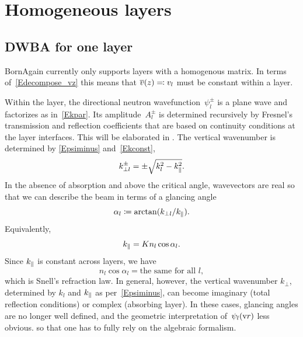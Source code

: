 \section{Homogeneous layers}\label{SLayHomo}

\subsection{DWBA for one layer}\label{SStep}

BornAgain currently only supports layers with a homogenous matrix.
In terms of~\cref{Edecompose_vz} this means that
$\overline{v}(z)\eqqcolon v_l$ must be constant within a layer.

Within the layer, the directional neutron wavefunction~$\psi^\pm_l$
is a plane wave and factorizes as in~\cref{Ekpar}.
Its amplitude~$A_l^\pm$ is determined recursively
by Fresnel's transmission and reflection coefficients
%
that are based on continuity conditions at the layer interfaces.
This will be elaborated in .
%
%
The vertical wavenumber is determined by \cref{Epsiminus} and~\cref{Ekconst},
\begin{equation}\label{Ekperpl}
  k_{\perp l}^\pm = \pm\sqrt{k_l^2 - k_\parallel^2}.
\end{equation}
In the absence of absorption and above the critical angle,
wavevectors are real
so that we can describe the beam in terms of a glancing angle
\begin{equation}\label{Edef_alpha}
  \alpha_l\coloneqq \arctan(k_{\perp l}/k_{\parallel}).
\end{equation}
Equivalently,
\begin{equation}\label{Ekplllncos}
  k_{\parallel}=K n_l \cos\alpha_l.
\end{equation}
Since $k_{\parallel}$ is constant across layers,
we have
\begin{equation}\label{ESnell}
  n_l \cos\alpha_l = \text{the same for all }l,
\end{equation}
which is Snell's refraction law.
In general, however, the vertical wavenumber $k_{\perp}$,
determined by $k_l$ and $k_\parallel$ as per~\cref{Epsiminus},
can become imaginary (total reflection conditions) or complex (absorbing layer).
%
In these cases, glancing angles are no longer well defined,
and the geometric interpretation of~$\psi_l(\text{v}{r})$ less obvious.
so that one has to fully rely on the algebraic formalism.

